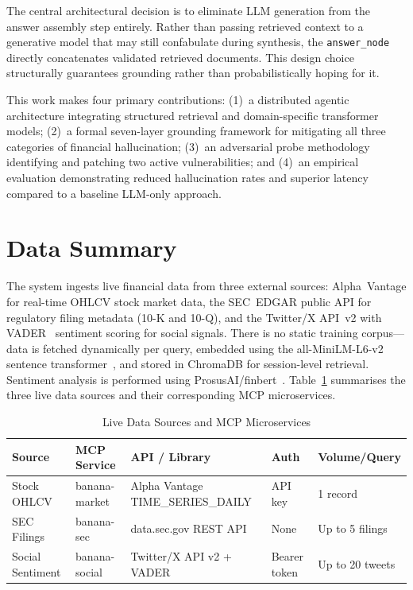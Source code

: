 \documentclass[10pt,journal,compsoc]{IEEEtran}
\newcommand{\node}[1]{\texttt{#1}}
\begin{document}
The central architectural decision is to eliminate LLM generation from
the answer assembly step entirely.
Rather than passing retrieved context to a generative model that may
still confabulate during synthesis, the \node{answer\_node} directly
concatenates validated retrieved documents.
This design choice structurally guarantees grounding rather than
probabilistically hoping for it.

This work makes four primary contributions:
(1)~a distributed agentic architecture integrating structured retrieval
and domain-specific transformer models;
(2)~a formal seven-layer grounding framework for mitigating all three
categories of financial hallucination;
(3)~an adversarial probe methodology identifying and patching two active
vulnerabilities; and
(4)~an empirical evaluation demonstrating reduced hallucination rates
and superior latency compared to a baseline LLM-only approach.

\section{Data Summary}
\label{sec:data}

The system ingests live financial data from three external sources:
Alpha~Vantage for real-time OHLCV stock market data, the SEC~EDGAR
public API for regulatory filing metadata (10-K and 10-Q), and the
Twitter/X API~v2 with VADER~\cite{hutto2014vader} sentiment scoring
for social signals.
There is no static training corpus---data is fetched dynamically per
query, embedded using the all-MiniLM-L6-v2 sentence
transformer~\cite{wang2020minilm}, and stored in ChromaDB for
session-level retrieval.
Sentiment analysis is performed using
ProsusAI/finbert~\cite{yang2020finbert}.
Table~\ref{tab:sources} summarises the three live data sources and
their corresponding MCP microservices.

\begin{table}[htbp]
\caption{Live Data Sources and MCP Microservices}
\label{tab:sources}
\centering
\small
\begin{tabular}{@{}p{2cm} p{2.8cm} p{4.5cm} p{1.8cm} p{2cm}@{}}
\toprule
\textbf{Source} & \textbf{MCP Service} & \textbf{API / Library} &
\textbf{Auth} & \textbf{Volume/Query} \\
\midrule
Stock OHLCV      & banana-market  & Alpha Vantage TIME\_SERIES\_DAILY & API key      & 1 record \\
SEC Filings      & banana-sec     & data.sec.gov REST API             & None         & Up to 5 filings \\
Social Sentiment & banana-social  & Twitter/X API v2 + VADER          & Bearer token & Up to 20 tweets \\
\bottomrule
\end{tabular}
\end{table}
\end{document}
